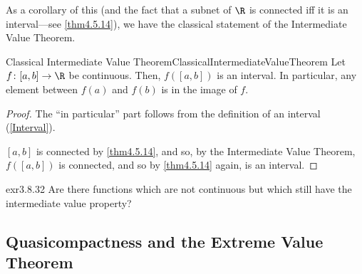 As a corollary of this (and the fact that a subnet of $\R$ is connected iff it is an interval---see \cref{thm4.5.14}), we have the classical statement of the Intermediate Value Theorem.
\begin{crl}{Classical Intermediate Value Theorem}{ClassicalIntermediateValueTheorem}
Let $f\colon [a,b]\rightarrow \R$ be continuous.  Then, $f([a,b])$ is an interval.  In particular, any element between $f(a)$ and $f(b)$ is in the image of $f$.
\begin{proof}
The ``in particular'' part follows from the definition of an interval (\cref{Interval}).

$[a,b]$ is connected by \cref{thm4.5.14}, and so, by the Intermediate Value Theorem, $f([a,b])$ is connected, and so by \cref{thm4.5.14} again, is an interval.
\end{proof}
\end{crl}
\begin{exr}{}{exr3.8.32}
Are there functions which are not continuous but which still have the intermediate value property?
\end{exr}

\subsection[Quasicompactness and the EVT]{Quasicompactness and the Extreme Value Theorem}


